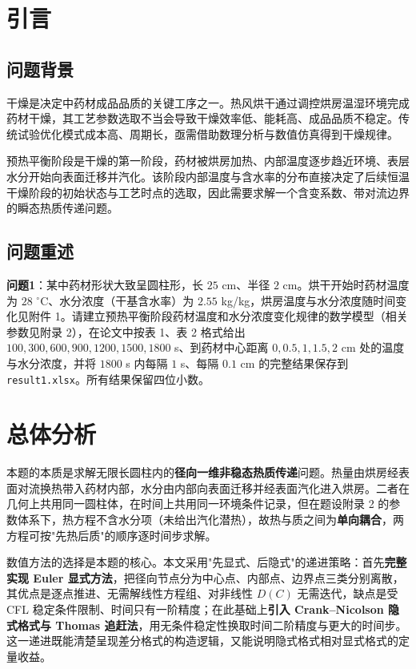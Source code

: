 \documentclass[12pt,a4paper]{ctexart}
\begin{document}
\tableofcontents
\newpage

\section{引言}
\subsection{问题背景}
干燥是决定中药材成品品质的关键工序之一。热风烘干通过调控烘房温湿环境完成药材干燥，其工艺参数选取不当会导致干燥效率低、能耗高、成品品质不稳定。传统试验优化模式成本高、周期长，亟需借助数理分析与数值仿真得到干燥规律。

预热平衡阶段是干燥的第一阶段，药材被烘房加热、内部温度逐步趋近环境、表层水分开始向表面迁移并汽化。该阶段内部温度与含水率的分布直接决定了后续恒温干燥阶段的初始状态与工艺时点的选取，因此需要求解一个含变系数、带对流边界的瞬态热质传递问题。

\subsection{问题重述}
\textbf{问题1}：某中药材形状大致呈圆柱形，长 $25$ cm、半径 $2$ cm。烘干开始时药材温度为 $28$ $^\circ$C、水分浓度（干基含水率）为 $2.55$ kg/kg，烘房温度与水分浓度随时间变化见附件 1。请建立预热平衡阶段药材温度和水分浓度变化规律的数学模型（相关参数见附录 2），在论文中按表 1、表 2 格式给出 $100,300,600,900,1200,1500,1800$ s、到药材中心距离 $0,0.5,1,1.5,2$ cm 处的温度与水分浓度，并将 $1800$ s 内每隔 $1$ s、每隔 $0.1$ cm 的完整结果保存到 \texttt{result1.xlsx}。所有结果保留四位小数。

\section{总体分析}
本题的本质是求解无限长圆柱内的\textbf{径向一维非稳态热质传递}问题。热量由烘房经表面对流换热带入药材内部，水分由内部向表面迁移并经表面汽化进入烘房。二者在几何上共用同一圆柱体，在时间上共用同一环境条件记录，但在题设附录 2 的参数体系下，热方程不含水分项（未给出汽化潜热），故热与质之间为\textbf{单向耦合}，两方程可按"先热后质"的顺序逐时间步求解。

数值方法的选择是本题的核心。本文采用"先显式、后隐式"的递进策略：首先\textbf{完整实现 Euler 显式方法}，把径向节点分为中心点、内部点、边界点三类分别离散，其优点是逐点推进、无需解线性方程组、对非线性 $D(C)$ 无需迭代，缺点是受 CFL 稳定条件限制、时间只有一阶精度；在此基础上\textbf{引入 Crank--Nicolson 隐式格式与 Thomas 追赶法}，用无条件稳定性换取时间二阶精度与更大的时间步。这一递进既能清楚呈现差分格式的构造逻辑，又能说明隐式格式相对显式格式的定量收益。
\end{document}
